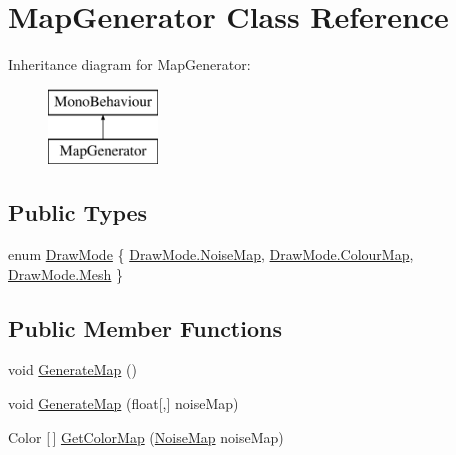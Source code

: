 \hypertarget{class_map_generator}{}\section{Map\+Generator Class Reference}
\label{class_map_generator}
Inheritance diagram for Map\+Generator\+:\begin{figure}[H]
\begin{center}
\leavevmode
\includegraphics[height=2.000000cm]{class_map_generator}
\end{center}
\end{figure}
\subsection*{Public Types}
\begin{DoxyCompactItemize}
\item 
enum \mbox{\hyperlink{class_map_generator_ad11b508087506616937d0dac5576c2ab}{Draw\+Mode}} \{ \mbox{\hyperlink{class_map_generator_ad11b508087506616937d0dac5576c2abaf1b803399772ec7c6b60c4dd5ee008e3}{Draw\+Mode.\+Noise\+Map}}, 
\mbox{\hyperlink{class_map_generator_ad11b508087506616937d0dac5576c2abaf0a9eaea3a84d380edf51e2f1236abd0}{Draw\+Mode.\+Colour\+Map}}, 
\mbox{\hyperlink{class_map_generator_ad11b508087506616937d0dac5576c2aba710fdb6adb881b408116ef95335e1961}{Draw\+Mode.\+Mesh}}
 \}
\end{DoxyCompactItemize}
\subsection*{Public Member Functions}
\begin{DoxyCompactItemize}
\item 
void \mbox{\hyperlink{class_map_generator_adc8f9ffbc33e6d4b1593900c3059fdf7}{Generate\+Map}} ()
\item 
void \mbox{\hyperlink{class_map_generator_ac6e51a7c21ff6e6bae4ae637536b4c53}{Generate\+Map}} (float\mbox{[},\mbox{]} noise\+Map)
\item 
Color \mbox{[}$\,$\mbox{]} \mbox{\hyperlink{class_map_generator_acfc52dd649037da30a270b6347b6c436}{Get\+Color\+Map}} (\mbox{\hyperlink{class_noise_map}{Noise\+Map}} noise\+Map)
\end{DoxyCompactItemize}
